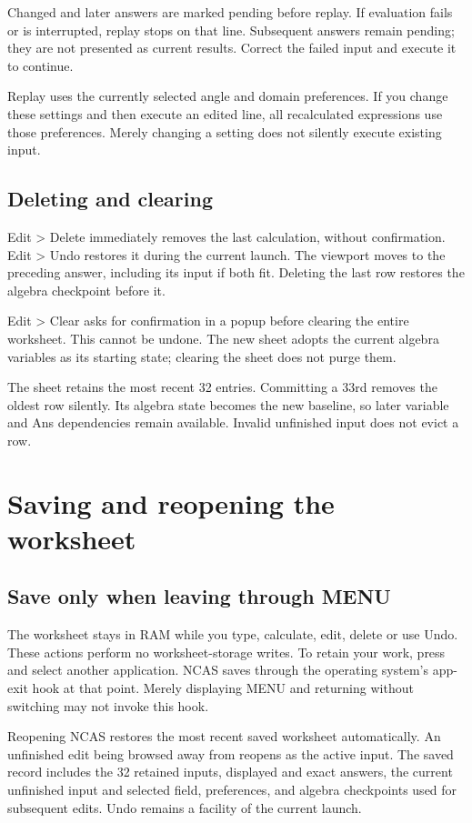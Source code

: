 \documentclass[11pt,a4paper]{article}
\newcommand{\key}[1]{\textsf{\fbox{\strut\scriptsize #1}}}
\newcommand{\menu}[1]{\textsf{\color{teal}#1}}
\begin{document}
Changed and later answers are marked pending before replay. If evaluation fails or is interrupted, replay stops on that line. Subsequent answers remain pending; they are not presented as current results. Correct the failed input and execute it to continue.

Replay uses the currently selected angle and domain preferences. If you change these settings and then execute an edited line, all recalculated expressions use those preferences. Merely changing a setting does not silently execute existing input.

\subsection{Deleting and clearing}
\menu{Edit > Delete} immediately removes the last calculation, without confirmation. \menu{Edit > Undo} restores it during the current launch. The viewport moves to the preceding answer, including its input if both fit. Deleting the last row restores the algebra checkpoint before it.

\menu{Edit > Clear} asks for confirmation in a popup before clearing the entire worksheet. This cannot be undone. The new sheet adopts the current algebra variables as its starting state; clearing the sheet does not purge them.

The sheet retains the most recent 32 entries. Committing a 33rd removes the oldest row silently. Its algebra state becomes the new baseline, so later variable and Ans dependencies remain available. Invalid unfinished input does not evict a row.
\clearpage

\section{Saving and reopening the worksheet}
\subsection{Save only when leaving through MENU}
The worksheet stays in RAM while you type, calculate, edit, delete or use Undo. These actions perform no worksheet-storage writes. To retain your work, press \key{MENU} and select another application. NCAS saves through the operating system's app-exit hook at that point. Merely displaying MENU and returning without switching may not invoke this hook.

Reopening NCAS restores the most recent saved worksheet automatically. An unfinished edit being browsed away from reopens as the active input. The saved record includes the 32 retained inputs, displayed and exact answers, the current unfinished input and selected field, preferences, and algebra checkpoints used for subsequent edits. Undo remains a facility of the current launch.
\end{document}
